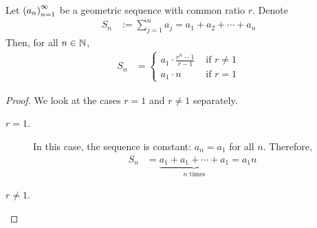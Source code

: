 \begin{theorem}
    Let $\left( a_n \right)_{n=1}^{\infty}$ be a geometric sequence with common ratio $r$. Denote
    \begin{align*}
        S_n &:= \sum_{j=1}^n a_j = a_1 + a_2 + \cdots + a_n
    \end{align*}
    Then, for all $n \in \mathbb{N}$,
    \begin{align}
        S_n &=
        \begin{cases}\displaystyle
            a_1 \cdot \frac{r^n - 1}{r - 1} & \text{ if } r \neq 1 \\
            a_1 \cdot n & \text{ if } r = 1
        \end{cases}
    \end{align}
\end{theorem}
\begin{proof}
    We look at the cases $r = 1$ and $r \neq 1$ separately.
    \begin{description}
        \item[\underline{$r = 1$}.] In this case, the sequence is constant: $a_n = a_1$ for all $n$. Therefore,
        \begin{align*}
            S_n &= \underbrace{a_1 + a_1 + \cdots + a_1}_{n \text{ times}} = a_1n
        \end{align*}
        \item[\underline{$r \neq 1$}.] 
    \end{description}
\end{proof}